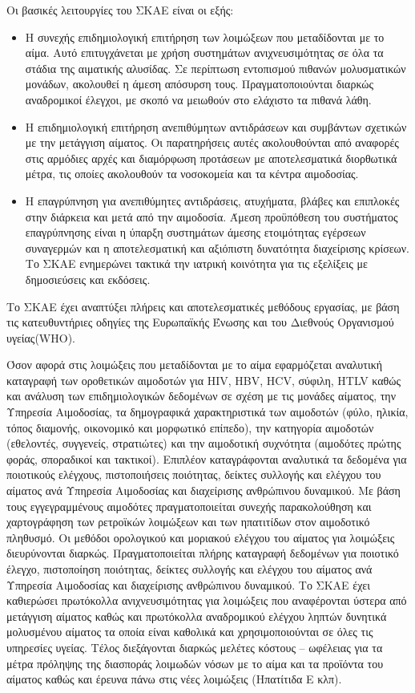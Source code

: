 Οι βασικές λειτουργίες του ΣΚΑΕ είναι οι εξής:
\begin{itemize}
		\item Η συνεχής επιδημιολογική επιτήρηση των λοιμώξεων που μεταδίδονται με το αίμα. Αυτό επιτυγχάνεται με χρήση συστημάτων ανιχνευσιμότητας σε όλα τα στάδια της αιματικής αλυσίδας. Σε περίπτωση εντοπισμού πιθανών μολυσματικών μονάδων, ακολουθεί η άμεση απόσυρση τους. Πραγματοποιούνται διαρκώς αναδρομικοί έλεγχοι, με σκοπό να μειωθούν στο ελάχιστο τα πιθανά λάθη. 
		\item	Η επιδημιολογική επιτήρηση ανεπιθύμητων αντιδράσεων και συμβάντων σχετικών με την μετάγγιση αίματος. Οι παρατηρήσεις αυτές ακολουθούνται από αναφορές στις αρμόδιες αρχές και διαμόρφωση προτάσεων με αποτελεσματικά διορθωτικά μέτρα, τις οποίες ακολουθούν τα νοσοκομεία και τα κέντρα αιμοδοσίας.  
		\item Η επαγρύπνηση για ανεπιθύμητες αντιδράσεις, ατυχήματα, βλάβες και επιπλοκές στην διάρκεια και μετά από την αιμοδοσία. Άμεση προϋπόθεση του συστήματος επαγρύπνησης είναι η ύπαρξη συστημάτων άμεσης ετοιμότητας εγέρσεων συναγερμών και η αποτελεσματική και αξιόπιστη δυνατότητα διαχείρισης κρίσεων.  Το ΣΚΑΕ ενημερώνει τακτικά την ιατρική κοινότητα για τις εξελίξεις με δημοσιεύσεις και εκδόσεις. 
		\end{itemize}
Το ΣΚΑΕ έχει αναπτύξει πλήρεις και αποτελεσματικές μεθόδους εργασίας, με βάση τις κατευθυντήριες οδηγίες της Ευρωπαϊκής Ένωσης και του Διεθνούς Οργανισμού υγείας(WHO). 

	Όσον αφορά στις λοιμώξεις που μεταδίδονται με το αίμα εφαρμόζεται αναλυτική καταγραφή των οροθετικών αιμοδοτών για HIV, HBV, HCV, σύφιλη, HTLV καθώς και ανάλυση 
των επιδημιολογικών δεδομένων σε σχέση με τις μονάδες αίματος, την Υπηρεσία Αιμοδοσίας, τα δημογραφικά χαρακτηριστικά των αιμοδοτών (φύλο, ηλικία, τόπος διαμονής, οικονομικό και μορφωτικό επίπεδο), την κατηγορία αιμοδοτών (εθελοντές, συγγενείς, στρατιώτες) και την αιμοδοτική συχνότητα (αιμοδότες πρώτης φοράς, σποραδικοί και τακτικοί). Επιπλέον καταγράφονται αναλυτικά τα δεδομένα για ποιοτικούς ελέγχους, πιστοποιήσεις ποιότητας, δείκτες συλλογής και ελέγχου του αίματος ανά Υπηρεσία Αιμοδοσίας και διαχείρισης ανθρώπινου δυναμικού. Με βάση τους εγγεγραμμένους αιμοδότες πραγματοποιείται συνεχής παρακολούθηση και χαρτογράφηση των ρετροϊκών λοιμώξεων και των ηπατιτίδων στον αιμοδοτικό πληθυσμό. Οι μεθόδοι ορολογικού και μοριακού ελέγχου του αίματος για λοιμώξεις διευρύνονται διαρκώς. Πραγματοποιείται πλήρης  καταγραφή δεδομένων για ποιοτικό έλεγχο, πιστοποίηση ποιότητας, δείκτες συλλογής και ελέγχου του αίματος ανά Υπηρεσία Αιμοδοσίας και διαχείρισης ανθρώπινου δυναμικού. Το ΣΚΑΕ έχει καθιερώσει πρωτόκολλα ανιχνευσιμότητας για λοιμώξεις που αναφέρονται ύστερα από μετάγγιση αίματος καθώς και πρωτόκολλα αναδρομικού ελέγχου ληπτών δυνητικά μολυσμένου αίματος τα οποία είναι καθολικά και χρησιμοποιούνται σε όλες τις υπηρεσίες υγείας. Τέλος διεξάγονται διαρκώς μελέτες κόστους – ωφέλειας για τα μέτρα πρόληψης της διασποράς λοιμωδών νόσων με το αίμα και τα προϊόντα του αίματος καθώς και έρευνα πάνω στις νέες λοιμώξεις (Ηπατίτιδα Ε κλπ). 

